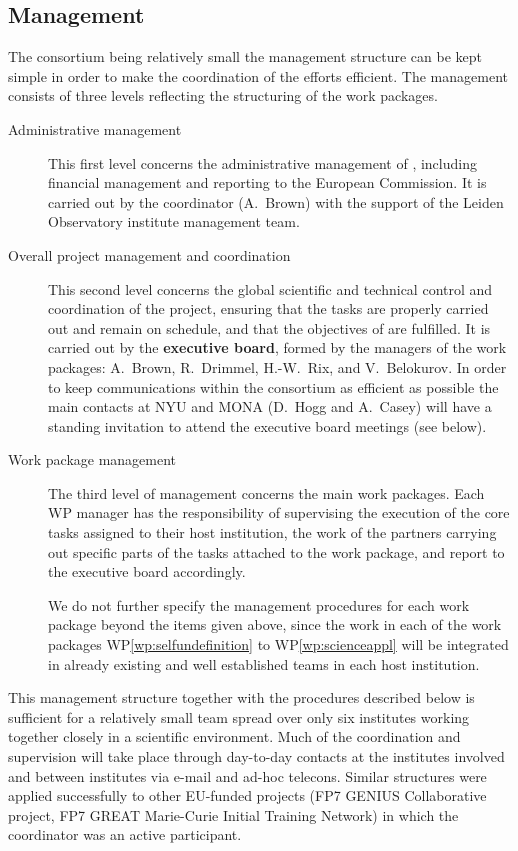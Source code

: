 \subsection{Management}
\label{sec:mgtdetails}

The {\acro} consortium being relatively small the management structure can be kept simple in order to make the coordination of the efforts efficient. The management consists of three levels reflecting the structuring of the {\acro} work packages.
\begin{description}
    \item[Administrative management] This first level concerns the administrative management of {\acro}, including financial management and reporting to the European Commission. It is carried out by the {\acro} coordinator (A.~Brown) with the support of the Leiden Observatory institute management team.
    \item[Overall project management and coordination] This second level concerns the global scientific and technical control and coordination of the project, ensuring that the tasks are properly carried out and remain on schedule, and that the objectives of {\acro} are fulfilled. It is carried out by the \textbf{{\acro} executive board}, formed by the managers of the work packages: A.~Brown, R.~Drimmel, H.-W.~Rix, and V.~Belokurov. In order to keep communications within the consortium as efficient as possible the main contacts at NYU and MONA (D.~Hogg and A.~Casey) will have a standing invitation to attend the executive board meetings (see below).
    \item[Work package management] The third level of management concerns the main work packages. Each WP manager has the responsibility of supervising the execution of the core tasks assigned to their host institution, the work of the partners carrying out specific parts of the tasks attached to the work package, and report to the executive board accordingly.
    
    We do not further specify the management procedures for each work package beyond the items given above, since the work in each of the work packages WP\ref{wp:selfundefinition} to WP\ref{wp:scienceappl} will be integrated in already existing and well established teams in each host institution.
\end{description}

This management structure together with the procedures described below is sufficient for a relatively small team spread over only six institutes working together closely in a scientific environment. Much of the coordination and supervision will take place through day-to-day contacts at the institutes involved and between institutes via e-mail and ad-hoc telecons. Similar structures were applied successfully to other EU-funded projects (FP7 GENIUS Collaborative project, FP7 GREAT Marie-Curie Initial Training Network) in which the coordinator was an active participant.

